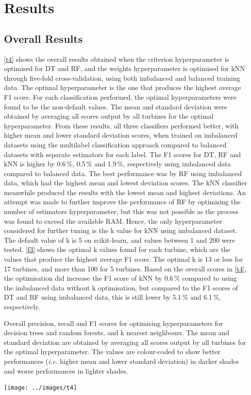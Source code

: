 \chapter{Results}\label{c3}

\section{Overall Results}

\autoref{t4} shows the overall results obtained when the criterion
hyperparameter is optimised for DT and RF, and the weights hyperparameter is
optimised for kNN through five-fold cross-validation, using both imbalanced
and balanced training data. The optimal hyperparameter is the one that
produces the highest average F1 score. For each classification performed, the
optimal hyperparameters were found to be the non-default values. The mean and
standard deviation were obtained by averaging all scores output by all
turbines for the optimal hyperparameter. From these results, all three
classifiers performed better, with higher mean and lower standard deviation
scores, when trained on imbalanced datasets using the multilabel
classification approach compared to balanced datasets with separate estimators
for each label. The F1 scores for DT, RF and kNN is higher by 0.6\,\%, 0.5\,\%
and 1.9\,\%, respectively using imbalanced data compared to balanced data. The
best performance was by RF using imbalanced data, which had the highest mean
and lowest deviation scores. The kNN classifier meanwhile produced the results
with the lowest mean and highest deviations. An attempt was made to further
improve the performance of RF by optimising the number of estimators
hyperparameter, but this was not possible as the process was found to exceed
the available RAM. Hence, the only hyperparameter considered for further
tuning is the k value for kNN using imbalanced dataset. The default value of k
is 5 on scikit-learn, and values between 1 and 200 were tested. \autoref{f3}
shows the optimal k values found for each turbine, which are the values that
produce the highest average F1 score. The optimal k is 13 or less for 17
turbines, and more than 100 for 5 turbines. Based on the overall scores in
\autoref{t4}, the optimisation did increase the F1 score of kNN by 0.6\,\%
compared to using the imbalanced data without k optimisation, but compared to
the F1 scores of DT and RF using imbalanced data, this is still lower by
5.1\,\% and 6.1\,\%, respectively.

\begin{table}
  \centering
  \caption{\label{t4}Overall precision, recall and F1 scores for optimising
  hyperparameters for decision trees and random forests, and k nearest
  neighbours. The mean and standard deviation are obtained by averaging all
  scores output by all turbines for the optimal hyperparameter. The values are
  colour-coded to show better performances (\textit{i.e.} higher mean and lower
  standard deviation) in darker shades and worse performances in lighter
  shades.}
  \texttt{[image: ../images/t4]}
\end{table}


